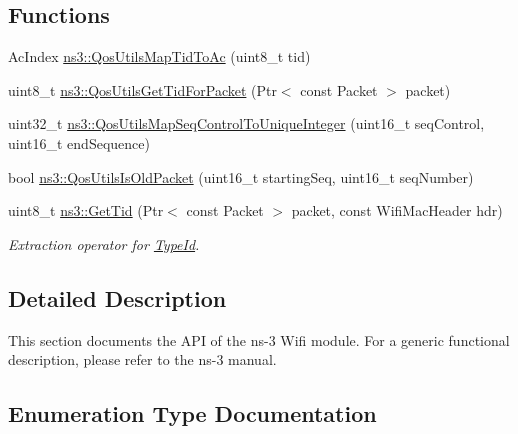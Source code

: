 \subsection*{Functions}
\begin{DoxyCompactItemize}
\item 
Ac\+Index \hyperlink{group__wifi_ga4e36efcff6dd83eaee42e1af0de43d48}{ns3\+::\+Qos\+Utils\+Map\+Tid\+To\+Ac} (uint8\+\_\+t tid)
\item 
uint8\+\_\+t \hyperlink{group__wifi_gaa7ad20082f78b63633d0557d24927150}{ns3\+::\+Qos\+Utils\+Get\+Tid\+For\+Packet} (Ptr$<$ const Packet $>$ packet)
\item 
uint32\+\_\+t \hyperlink{group__wifi_ga841296fae895cac77a0e14183b8134e0}{ns3\+::\+Qos\+Utils\+Map\+Seq\+Control\+To\+Unique\+Integer} (uint16\+\_\+t seq\+Control, uint16\+\_\+t end\+Sequence)
\item 
bool \hyperlink{group__wifi_ga5cb9ea723837c5a036e622612f2d0bb0}{ns3\+::\+Qos\+Utils\+Is\+Old\+Packet} (uint16\+\_\+t starting\+Seq, uint16\+\_\+t seq\+Number)
\item 
uint8\+\_\+t \hyperlink{group__wifi_ga92cc18e2c5aa6bed3728860bbad76ff8}{ns3\+::\+Get\+Tid} (Ptr$<$ const Packet $>$ packet, const Wifi\+Mac\+Header hdr)
\begin{DoxyCompactList}\small\item\em Extraction operator for \hyperlink{classns3_1_1TypeId}{Type\+Id}. \end{DoxyCompactList}\end{DoxyCompactItemize}


\subsection{Detailed Description}
This section documents the A\+PI of the ns-\/3 Wifi module. For a generic functional description, please refer to the ns-\/3 manual. 

\subsection{Enumeration Type Documentation}
